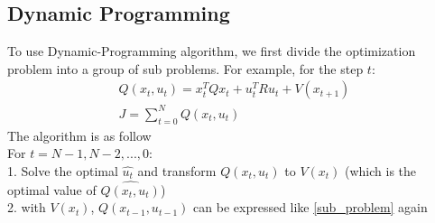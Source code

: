 \documentclass{article}
\begin{document}
\subsection{Dynamic Programming}
To use Dynamic-Programming algorithm, we first divide the optimization problem into a group of sub problems. For example, for the step $t$:
\begin{gather}
    Q(x_t, u_t) = x_t^T Q x_t + u_t^T R u_t + V(x_{t+1}) \label{sub_problem}\\
    J = \sum_{t=0}^N{Q(x_t, u_t)}
\end{gather}
The algorithm is as follow\\
For $t=N-1, N-2, ..., 0$:\\
1. Solve the optimal $\hat{u_t}$ and transform $Q(x_t, u_t)$ to $V(x_t)$ (which is the optimal value of $\hat{Q(x_t, u_t)}$)\\
2. with $V(x_t)$, $Q(x_{t-1}, u_{t-1})$ can be expressed like \eqref{sub_problem} again
\end{document}
